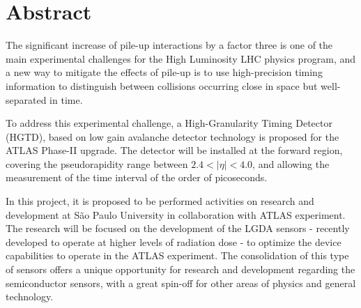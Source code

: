 \chapter*{Abstract}


The significant increase of pile-up interactions by a factor three \cite{tdr} is one of the main experimental challenges for the High Luminosity LHC physics program, and a new way to mitigate the effects of pile-up is to use high-precision timing information to distinguish between collisions occurring close in space but well-separated in time.

To address this experimental challenge, a High-Granularity Timing Detector (HGTD), based on low gain avalanche detector technology is proposed for the ATLAS Phase-II upgrade. The detector will be installed at the forward region, covering the pseudorapidity range between $2.4< |\eta| <4.0$, and allowing the measurement of the time interval of the order of picoseconds.


In this project, it is proposed to be performed activities on research and development at São Paulo University in collaboration with ATLAS experiment. The research will be focused on the development of the LGDA sensors - recently developed to operate at higher levels of radiation dose - to optimize the device capabilities to operate in the ATLAS experiment. The consolidation of this type of sensors offers a unique opportunity for research and development regarding the semiconductor sensors, with a great spin-off for other areas of physics and general technology.